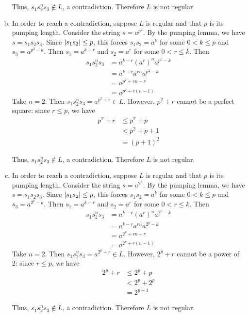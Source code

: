 \begin{solution}
\begin{enumerate}[(a)]
    Thus, \(s_1s_2^n s_3\not\in L\), a contradiction. Therefore \(L\) is not regular.
    \item In order to reach a contradiction, suppose \(L\) is regular and that \(p\) is its pumping length. Consider the string \(s=a^{p^2}\). By the pumping lemma, we have \(s=s_1s_2s_3\). Since \(\abs{s_1s_2}\leq p\), this forces \(s_1s_2=a^k\) for some \(0<k\leq p\) and \(s_3=a^{p^2-k}\). Then \(s_1=a^{k-r}\) and \(s_2=a^r\) for some \(0<r\leq k\). Then
    \begin{align*}
        s_1s_2^n s_3 &= a^{k-r}{(a^r)}^n a^{p^2-k}\\
                    &= a^{k-r}a^{rn}a^{p^2-k}\\
                    &= a^{p^2+rn-r}\\
                    &= a^{p^2+r(n-1)}
    \end{align*}
    Take \(n=2\). Then \(s_1s_2^n s_3=a^{p^2+r}\in L\). However, \(p^2+r\) cannot be a perfect square: since \(r \leq p\), we have 
    \begin{align*}
        p^2+r &\leq p^2 + p\\
              &< p^2 + p + 1\\
              &= {(p+1)}^2
    \end{align*}
    
    Thus, \(s_1s_2^n s_3\not\in L\), a contradiction. Therefore \(L\) is not regular.
    \item In order to reach a contradiction, suppose \(L\) is regular and that \(p\) is its pumping length. Consider the string \(s=a^{2^p}\). By the pumping lemma, we have \(s=s_1s_2s_3\). Since \(\abs{s_1s_2}\leq p\), this forces \(s_1s_2=a^k\) for some \(0<k\leq p\) and \(s_3=a^{2^p-k}\). Then \(s_1=a^{k-r}\) and \(s_2=a^r\) for some \(0<r\leq k\). Then
    \begin{align*}
        s_1s_2^n s_3 &= a^{k-r}{(a^r)}^n a^{2^p-k}\\
                    &= a^{k-r}a^{rn}a^{2^p-k}\\
                    &= a^{2^p+rn-r}\\
                    &= a^{2^p+r(n-1)}
    \end{align*}
    Take \(n=2\). Then \(s_1s_2^n s_3=a^{2^p+r}\in L\). However, \(2^p+r\) cannot be a power of 2: since \(r \leq p\), we have 
    \begin{align*}
        2^p+r &\leq 2^p + p\\
              &< 2^p + 2^p\\
              &= 2^{p+1}
    \end{align*}
    
    Thus, \(s_1s_2^n s_3\not\in L\), a contradiction. Therefore \(L\) is not regular.
\end{enumerate}
    
\end{solution}

